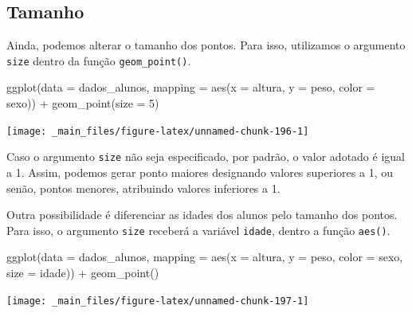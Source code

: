 \documentclass[
  brazilian,
]{book}
\newenvironment{Shaded}{\begin{snugshade}}{\end{snugshade}}
\newcommand{\AttributeTok}[1]{\textcolor[rgb]{0.77,0.63,0.00}{#1}}
\newcommand{\DecValTok}[1]{\textcolor[rgb]{0.00,0.00,0.81}{#1}}
\newcommand{\FunctionTok}[1]{\textcolor[rgb]{0.00,0.00,0.00}{#1}}
\newcommand{\NormalTok}[1]{#1}
\newcommand{\SpecialCharTok}[1]{\textcolor[rgb]{0.00,0.00,0.00}{#1}}
\begin{document}
\hypertarget{tamanho}{%
\subsection{Tamanho}\label{tamanho}}

Ainda, podemos alterar o tamanho dos pontos. Para isso, utilizamos o argumento \texttt{size} dentro da função \texttt{geom\_point()}.

\begin{Shaded}
\begin{Highlighting}[]
\FunctionTok{ggplot}\NormalTok{(}\AttributeTok{data =}\NormalTok{ dados\_alunos,}
       \AttributeTok{mapping =} \FunctionTok{aes}\NormalTok{(}\AttributeTok{x =}\NormalTok{ altura,}
                     \AttributeTok{y =}\NormalTok{ peso,}
                     \AttributeTok{color =}\NormalTok{ sexo)) }\SpecialCharTok{+}
  \FunctionTok{geom\_point}\NormalTok{(}\AttributeTok{size =} \DecValTok{5}\NormalTok{)}
\end{Highlighting}
\end{Shaded}

\begin{center}\texttt{[image: \_main\_files/figure-latex/unnamed-chunk-196-1]} \end{center}

Caso o argumento \texttt{size} não seja especificado, por padrão, o valor adotado é igual a 1. Assim, podemos gerar ponto maiores designando valores superiores a 1, ou senão, pontos menores, atribuindo valores inferiores a 1.

Outra possibilidade é diferenciar as idades dos alunos pelo tamanho dos pontos. Para isso, o argumento \texttt{size} receberá a variável \texttt{idade}, dentro a função \texttt{aes()}.

\begin{Shaded}
\begin{Highlighting}[]
\FunctionTok{ggplot}\NormalTok{(}\AttributeTok{data =}\NormalTok{ dados\_alunos,}
       \AttributeTok{mapping =} \FunctionTok{aes}\NormalTok{(}\AttributeTok{x =}\NormalTok{ altura,}
                     \AttributeTok{y =}\NormalTok{ peso,}
                     \AttributeTok{color =}\NormalTok{ sexo,}
                     \AttributeTok{size =}\NormalTok{ idade)) }\SpecialCharTok{+}
  \FunctionTok{geom\_point}\NormalTok{()}
\end{Highlighting}
\end{Shaded}

\begin{center}\texttt{[image: \_main\_files/figure-latex/unnamed-chunk-197-1]} \end{center}
\end{document}
